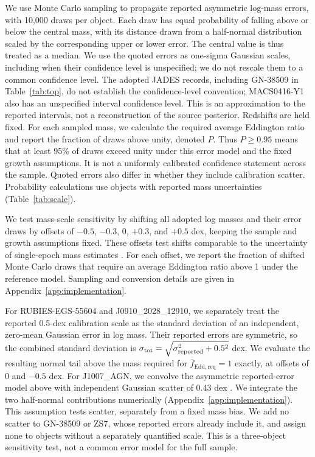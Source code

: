 \documentclass[pdflatex,sn-basic]{sn-jnl}
\begin{document}
We use Monte Carlo sampling to propagate reported asymmetric log-mass errors,
with 10,000 draws per object. Each draw has equal probability of falling above
or below the central mass, with its distance drawn from a half-normal
distribution scaled by the corresponding upper or lower error. The central
value is thus treated as a median. We use the quoted errors as one-sigma
Gaussian scales, including when their confidence level is unspecified;
we do not rescale them to a common confidence level. The adopted JADES records,
including GN-38509 in Table~\ref{tab:top}, do not establish the confidence-level
convention; MACS0416-Y1 also has an unspecified interval confidence level.
This is an approximation
to the reported intervals, not a reconstruction of the source posterior.
Redshifts are held fixed. For each sampled mass, we calculate the required
average Eddington ratio and report the fraction of draws above unity, denoted
$P$. Thus $P\geq0.95$ means that at least 95\% of draws exceed unity under
this error model and the fixed growth assumptions. It is not a uniformly
calibrated confidence statement across the sample. Quoted errors also differ
in whether they include calibration scatter.
Probability calculations use objects with reported mass uncertainties (Table~\ref{tab:scale}).

We test mass-scale sensitivity by shifting all adopted log masses and their
error draws by offsets of $-0.5$, $-0.3$, $0$, $+0.3$, and $+0.5$ dex, keeping the sample and growth
assumptions fixed. These offsets test shifts comparable to the uncertainty of single-epoch
mass estimates \citep{shen2013}.
For each offset, we report the fraction of shifted Monte Carlo draws that
require an average Eddington ratio above 1 under the reference model.
Sampling and conversion details are given in Appendix~\ref{app:implementation}.

For RUBIES-EGS-55604 and J0910\_2028\_12910, we separately treat the
reported 0.5-dex calibration scale as the standard deviation of an independent,
zero-mean Gaussian error in log mass. Their reported errors are symmetric,
so the combined standard deviation is
$\sigma_{\rm tot}=\sqrt{\sigma_{\rm reported}^2+0.5^2}$ dex.
We evaluate the resulting normal tail above the mass required for
$\overline{f}_{\mathrm{Edd,req}}=1$ exactly, at offsets of 0 and $-0.5$ dex.
For J1007\_AGN, we convolve the asymmetric reported-error model above with
independent Gaussian scatter of 0.43 dex \citep{schindler25expansion}.
We integrate the two half-normal contributions numerically
(Appendix~\ref{app:implementation}).
This assumption tests scatter, separately from a fixed mass bias. We add no
scatter to GN-38509 or ZS7, whose reported errors already include it, and
assign none to objects without a separately quantified scale. This is a
three-object sensitivity test, not a common error model for the full sample.
\end{document}
